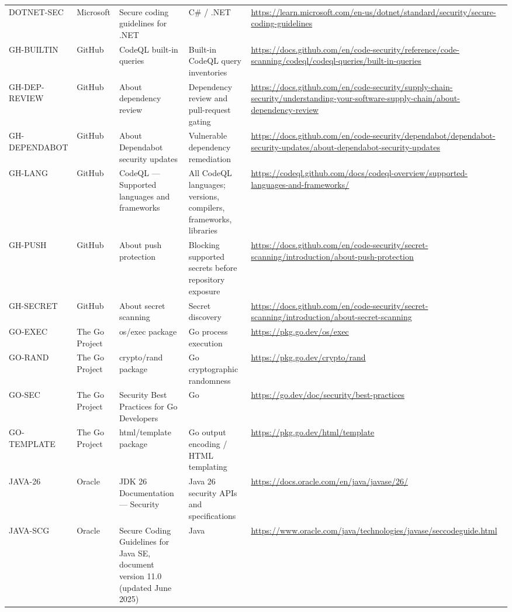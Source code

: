\documentclass[10pt,letterpaper]{article}
\begin{document}
\begin{landscape}
\begin{longtable}{@{}P{0.82in}P{1.23in}P{2.25in}P{1.7in}P{3.0in}@{}}
DOTNET-SEC & Microsoft & Secure coding guidelines for .NET & C\# / .NET & \url{https://learn.microsoft.com/en-us/dotnet/standard/security/secure-coding-guidelines}\\
GH-BUILTIN & GitHub & CodeQL built-in queries & Built-in CodeQL query inventories & \url{https://docs.github.com/en/code-security/reference/code-scanning/codeql/codeql-queries/built-in-queries}\\
GH-DEP-REVIEW & GitHub & About dependency review & Dependency review and pull-request gating & \url{https://docs.github.com/en/code-security/supply-chain-security/understanding-your-software-supply-chain/about-dependency-review}\\
GH-DEPENDABOT & GitHub & About Dependabot security updates & Vulnerable dependency remediation & \url{https://docs.github.com/en/code-security/dependabot/dependabot-security-updates/about-dependabot-security-updates}\\
GH-LANG & GitHub & CodeQL --- Supported languages and frameworks & All CodeQL languages; versions, compilers, frameworks, libraries & \url{https://codeql.github.com/docs/codeql-overview/supported-languages-and-frameworks/}\\
GH-PUSH & GitHub & About push protection & Blocking supported secrets before repository exposure & \url{https://docs.github.com/en/code-security/secret-scanning/introduction/about-push-protection}\\
GH-SECRET & GitHub & About secret scanning & Secret discovery & \url{https://docs.github.com/en/code-security/secret-scanning/introduction/about-secret-scanning}\\
GO-EXEC & The Go Project & os/exec package & Go process execution & \url{https://pkg.go.dev/os/exec}\\
GO-RAND & The Go Project & crypto/rand package & Go cryptographic randomness & \url{https://pkg.go.dev/crypto/rand}\\
GO-SEC & The Go Project & Security Best Practices for Go Developers & Go & \url{https://go.dev/doc/security/best-practices}\\
GO-TEMPLATE & The Go Project & html/template package & Go output encoding / HTML templating & \url{https://pkg.go.dev/html/template}\\
JAVA-26 & Oracle & JDK 26 Documentation --- Security & Java 26 security APIs and specifications & \url{https://docs.oracle.com/en/java/javase/26/}\\
JAVA-SCG & Oracle & Secure Coding Guidelines for Java SE, document version 11.0 (updated June 2025) & Java & \url{https://www.oracle.com/java/technologies/javase/seccodeguide.html}\\

\end{longtable}
\end{landscape}
\end{document}

